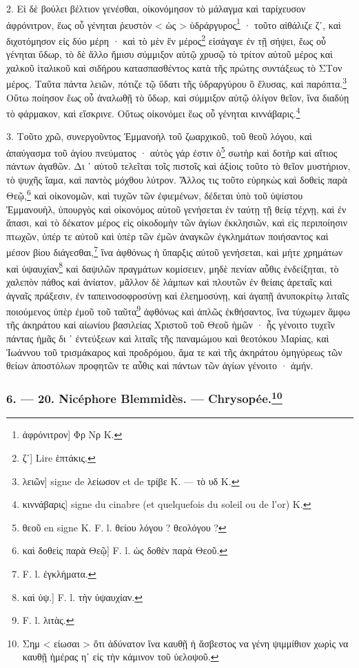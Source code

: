 \documentclass[a4paper, 11pt, oneside, polutonikogreek, french]{article}
\begin{document}
2. Εἰ δὲ βούλει βέλτιον γενέσθαι, οἰκονόμησον τὸ μάλαγμα καὶ ταρίχευσον ἀφρόνιτρον, ἕως οὗ γένηται ῥευστὸν < ὡς > ὑδράργυρος\footnote{ἀφρόνιτρον] Φρ Νρ K.} · τοῦτο αἰθάλιζε ζʹ, καὶ διχοτόμησον εἰς δύο μέρη · καὶ τὸ μὲν ἓν μέρος\footnote{ζʹ] Lire ἑπτάκις.} εἰσάγαγε ἐν τῇ σήψει, ἕως οὗ γένηται ὕδωρ, τὸ δὲ ἄλλο ἥμισυ σύμμιξον αὐτῷ χρυσῷ τὸ τρίτον αὐτοῦ μέρος καὶ χαλκοῦ ἰταλικοῦ καὶ σιδήρου κατασπασθέντος κατὰ τῆς πρώτης συντάξεως τὸ ΣΤον μέρος. Ταῦτα πάντα λειῶν, πότιζε τῷ ὕδατι τῆς ὑδραργύρου ὃ ἔλυσας, καὶ παρόπτα.\footnote{λειῶν] signe de λείωσον et de τρίβε K. --- τὸ υδ K.} Οὕτω ποίησον ἕως οὗ ἀναλωθῇ τὸ ὕδωρ, καὶ σύμμιξον αὐτῷ ὀλίγον θεῖον, ἵνα διαδύῃ τὸ φάρμακον, καὶ εἴσκρινε. Οὕτως οἰκονόμει ἕως οὗ γένηται κιννάβαρις.\footnote{κιννάβαρις] signe du cinabre (et quelquefois du soleil ou de l'or) K.}

3. Τοῦτο χρῶ, συνεργοῦντος Ἐμμανοὴλ τοῦ ζωαρχικοῦ, τοῦ θεοῦ λόγου, καὶ ἀπαύγασμα τοῦ ἁγίου πνεύματος · αὐτὸς γάρ ἐστιν ὁ\footnote{θεοῦ en signe K. F. l. θείου λόγου ? θεολόγου ?} σωτὴρ καὶ δοτὴρ καὶ αἴτιος πάντων ἀγαθῶν. Δι ᾽ αὐτοῦ τελεῖται τοῖς πιστοῖς καὶ ἀξίοις τοῦτο τὸ θεῖον μυστήριον, τὸ ψυχῆς ἴαμα, καὶ παντὸς μόχθου λύτρον. Ἄλλος τις τοῦτο εὑρηκὼς καὶ δοθεὶς παρὰ Θεῷ,\footnote{καὶ δοθεὶς παρὰ Θεῷ] F. l. ὡς δοθὲν παρὰ Θεοῦ.} καὶ οἰκονομῶν, καὶ τυχῶν τῶν ἐφιεμένων, δέδεται ὑπὸ τοῦ ὑψίστου Ἐμμανουὴλ, ὑπουργὸς καὶ οἰκονόμος αὐτοῦ γενήσεται ἐν ταύτῃ τῇ θείᾳ τέχνῃ, καὶ ἐν ἅπασι, καὶ τὸ δέκατον μέρος εἰς οἰκοδομὴν τῶν ἀγίων ἐκκλησιῶν, καὶ εἰς περιποίησιν πτωχῶν, ὐπέρ τε αὐτοῦ καὶ ὑπὲρ τῶν ἐμῶν ἀναγκῶν ἐγκλημάτων ποιήσαντος καὶ μέσον βίου διάγεσθαι,\footnote{F. l. ἐγκλήματα.} ἵνα ἀφθόνως ἡ ὕπαρξις αὐτοῦ γενήσεται, καὶ μήτε χρημάτων καὶ ὑψαυχίαν\footnote{καὶ ὑψ.] F. l. τὴν ὑψαυχίαν.} καὶ δαψιλῶν πραγμάτων κομίσειεν, μηδὲ πενίαν αὖθις ἐνδείξηται, τὸ χαλεπὸν πάθος καὶ ἀνίατον, μᾶλλον δὲ λάμπων καὶ πλουτῶν ἐν θείαις ἀρεταῖς καὶ ἁγναῖς πράξεσιν, ἐν ταπεινοσοφροσύνῃ καὶ ἐλεημοσύνῃ, καὶ ἀγαπῇ ἀνυποκρίτῳ λιταῖς ποιούμενος ὑπὲρ ἐμοῦ τοῦ ταῦτα\footnote{F. l. λιτὰς.} ἀφθόνως καὶ ἁπλῶς ἐκθήσαντος, ἵνα τύχωμεν ἄμφω τῆς ἀκηράτου καὶ αἰωνίου βασιλείας Χριστοῦ τοῦ Θεοῦ ἡμῶν · ἧς γένοιτο τυχεῖν πάντας ἡμᾶς δι ᾽ ἐντεύξεων καὶ λιταῖς τῆς παναμώμου καὶ θεοτόκου Μαρίας, καὶ Ἰωάννου τοῦ τρισμάκαρος καὶ προδρόμου, ἅμα τε καὶ τῆς ἀκηράτου ὁμηγύρεως τῶν θείων ἀποστόλων προφητῶν τε αὖθις καὶ πάντων τῶν ἀγίων γένοιτο · ἀμήν.

\bigskip
\centerline{\EightStarTaper}
\centerline{\EightStarTaper\EightStarTaper}
\bigskip

\subsubsection[6. --- 20. Nicéphore Blemmidès. --- Chrysopée.]{6. --- 20. Nicéphore Blemmidès. --- Chrysopée.\footnote{Σημ < είωσαι > ὅτι ἀδύνατον ἵνα καυθῇ ἡ ἄσβεστος να γένη ψιμμίθιον χωρὶς να καυθῇ ἡμέρας ηʹ εἰς τὴν κάμινον τοῦ ὑελοψοῦ.}}
\end{document}
